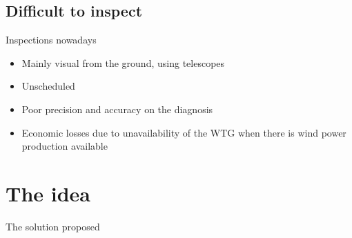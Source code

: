\subsection{Difficult to  inspect}

\begin{frame}{Inspections nowadays}
	
	\begin{itemize}
		\item Mainly visual from the ground, using telescopes
		\item Unscheduled
		\item Poor precision and accuracy on the diagnosis
		\item Economic losses due to unavailability of the WTG when there is wind power production available
	\end{itemize}
	
	
\end{frame}

\section{The idea}

\begin{frame}{The solution proposed}

\end{frame}
%
%
%
%
%
%
%
%
%


